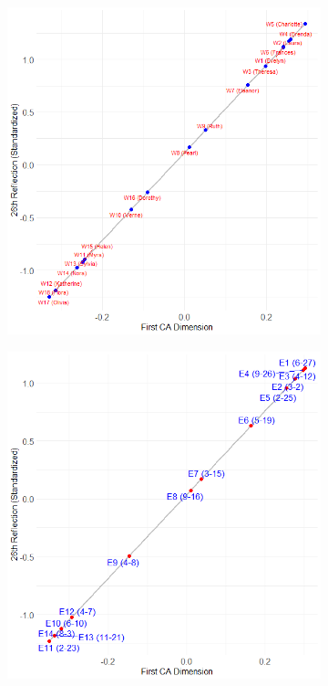 \documentclass[a4paper,fleqn]{cas-sc}
\begin{document}
\begin{figure}
    \captionsetup[subfigure]{font=footnotesize,labelfont=footnotesize}
    \centering
     \begin{subfigure}[b]{0.45\textwidth}
        \includegraphics[width=1.0\textwidth]{Plots/p-ca-ref-corr.png}
            \caption{}
            \label{fig:p-ca-ref}
    \end{subfigure}
     \begin{subfigure}[b]{0.45\textwidth}
        \includegraphics[width=1.0\textwidth]{Plots/g-ca-ref-corr.png}

\end{subfigure}
\end{figure}
\end{document}
